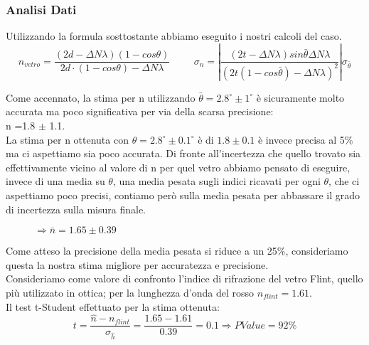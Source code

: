 \documentclass{article}
\theoremstyle{definition}
\begin{document}
\subsubsection{Analisi Dati}
Utilizzando la formula sosttostante abbiamo eseguito i nostri calcoli del caso.\\
\[n_{vetro} =\frac{(2d - \Delta N \lambda)(1 - cos\theta)}{2d \cdot (1 - cos\theta) - \Delta N \lambda} \hspace{1cm} \sigma_{n} = \left | \frac{(2t - \Delta N \lambda )sin\bar{\theta}\Delta N \lambda}{\left( 2t( 1 - cos\bar{\theta} ) -\Delta N \lambda \right)  ^{2}}  \right | \sigma_{\bar{\theta}} \]

Come accennato, la stima per n utilizzando \(\bar{\theta} = 2.8^{\circ} \pm 1^{\circ}\) è sicuramente molto accurata ma poco significativa per via della scarsa precisione:\\ n =1.8 $\pm$ 1.1.\\
La stima per n ottenuta con \(\theta = 2.8^{\circ} \pm 0.1^{\circ}\) è di \(1.8 \pm 0.1\) è invece precisa al 5\% ma ci aspettiamo sia poco accurata. Di fronte all'incertezza che quello trovato sia effettivamente vicino al valore di n per quel vetro abbiamo pensato di eseguire, invece di una media su \(\theta\), una media pesata sugli indici ricavati per ogni \(\theta\), che ci aspettiamo poco precisi, contiamo però sulla media pesata per abbassare il grado di incertezza sulla misura finale.


\begin{figure}[!htbp]
    	\captionsetup{labelformat=empty}
             \caption{\(\Rightarrow  \bar{n}  = 1.65 \pm 0.39\) }
\end{figure}
Come atteso la precisione della media pesata si riduce a un 25\%, consideriamo questa la nostra stima migliore per accuratezza e precisione.\\
Consideriamo come valore di confronto l'indice di rifrazione del vetro Flint, quello più utilizzato in ottica; per la lunghezza d'onda del rosso  $n_{flint} = 1.61$.\\
Il test t-Student effettuato per la stima ottenuta:
\[t = \frac{\hat{n} - n_{flint}}{\sigma_{\hat{h}}} = \frac{1.65 - 1.61}{0.39} = 0.1 \Rightarrow PValue = 92\%\]
\end{document}
